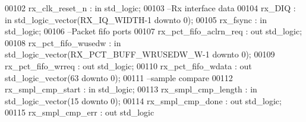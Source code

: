 \begin{DoxyCode}
00102       \textcolor{vhdlchar}{rx_clk_reset_n}          \textcolor{vhdlchar}{:} \textcolor{keywordflow}{in}     \textcolor{comment}{std\_logic};
00103 \textcolor{keyword}{         --Rx interface data }
00104       \textcolor{vhdlchar}{rx_DIQ}                  \textcolor{vhdlchar}{:} \textcolor{keywordflow}{in}     \textcolor{comment}{std\_logic\_vector}\textcolor{vhdlchar}{(}\textcolor{vhdlchar}{RX_IQ_WIDTH}\textcolor{vhdlchar}{-}\textcolor{vhdllogic}{}\textcolor{vhdllogic}{1} \textcolor{keywordflow}{downto} \textcolor{vhdllogic}{}\textcolor{vhdllogic}{0}\textcolor{vhdlchar}{)};
00105       \textcolor{vhdlchar}{rx_fsync}                \textcolor{vhdlchar}{:} \textcolor{keywordflow}{in}     \textcolor{comment}{std\_logic};
00106 \textcolor{keyword}{         --Packet fifo ports}
00107       \textcolor{vhdlchar}{rx_pct_fifo_aclrn_req}   \textcolor{vhdlchar}{:} \textcolor{keywordflow}{out}    \textcolor{comment}{std\_logic};
00108       \textcolor{vhdlchar}{rx_pct_fifo_wusedw}      \textcolor{vhdlchar}{:} \textcolor{keywordflow}{in}     \textcolor{comment}{std\_logic\_vector}\textcolor{vhdlchar}{(}\textcolor{vhdlchar}{RX_PCT_BUFF_WRUSEDW_W}\textcolor{vhdlchar}{-}\textcolor{vhdllogic}{}\textcolor{vhdllogic}{1} \textcolor{keywordflow}{downto} \textcolor{vhdllogic}{}\textcolor{vhdllogic}{0}\textcolor{vhdlchar}{)};
00109       \textcolor{vhdlchar}{rx_pct_fifo_wrreq}       \textcolor{vhdlchar}{:} \textcolor{keywordflow}{out}    \textcolor{comment}{std\_logic};
00110       \textcolor{vhdlchar}{rx_pct_fifo_wdata}       \textcolor{vhdlchar}{:} \textcolor{keywordflow}{out}    \textcolor{comment}{std\_logic\_vector}\textcolor{vhdlchar}{(}\textcolor{vhdllogic}{}\textcolor{vhdllogic}{63} \textcolor{keywordflow}{downto} \textcolor{vhdllogic}{}\textcolor{vhdllogic}{0}\textcolor{vhdlchar}{)};
00111 \textcolor{keyword}{         --sample compare}
00112       \textcolor{vhdlchar}{rx_smpl_cmp_start}       \textcolor{vhdlchar}{:} \textcolor{keywordflow}{in}     \textcolor{comment}{std\_logic};
00113       \textcolor{vhdlchar}{rx_smpl_cmp_length}      \textcolor{vhdlchar}{:} \textcolor{keywordflow}{in}     \textcolor{comment}{std\_logic\_vector}\textcolor{vhdlchar}{(}\textcolor{vhdllogic}{}\textcolor{vhdllogic}{15} \textcolor{keywordflow}{downto} \textcolor{vhdllogic}{}\textcolor{vhdllogic}{0}\textcolor{vhdlchar}{)};
00114       \textcolor{vhdlchar}{rx_smpl_cmp_done}        \textcolor{vhdlchar}{:} \textcolor{keywordflow}{out}    \textcolor{comment}{std\_logic};
00115       \textcolor{vhdlchar}{rx_smpl_cmp_err}         \textcolor{vhdlchar}{:} \textcolor{keywordflow}{out}    \textcolor{comment}{std\_logic}      

\end{DoxyCode}
